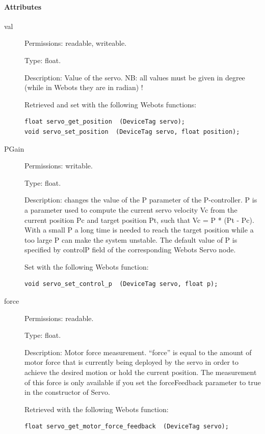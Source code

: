 \paragraph{Attributes}
\label{webots.uobjects.robotdevices.servo.attributes}%

\noindent
\begin{description}
\item[{         val
 }]            Permissions: readable, writeable.


 Type: float.


 Description: Value of the servo. NB: all values must be given in
 degree (while in Webots they are in radian) !


          Retrieved and set with the following Webots functions:


\begin{lstlisting}
float servo_get_position  (DeviceTag servo);
void servo_set_position  (DeviceTag servo, float position);
\end{lstlisting}
\item[{         PGain
 }]            Permissions: writable.


 Type: float.


 Description: changes the value of the P parameter of the
 P-{}controller. P is a parameter used to compute the current servo
 velocity Vc from the current position Pc and target position Pt, such
 that Vc = P * (Pt -{} Pc).  With a small P a long time is needed to
 reach the target position while a too large P can make the system
 unstable.  The default value of P is specified by controlP field of
 the corresponding Webots Servo node.


          Set with the following Webots function:


\begin{lstlisting}
void servo_set_control_p  (DeviceTag servo, float p);
\end{lstlisting}
\item[{         force
 }]            Permissions: readable.


 Type: float.


 Description: Motor force measurement. ``force'' is equal to the amount
 of motor force that is currently being deployed by the servo in order
 to achieve the desired motion or hold the current position.  The
 measurement of this force is only available if you set the
 forceFeedback parameter to true in the constructor of Servo.


          Retrieved with the following Webots function:


\begin{lstlisting}
float servo_get_motor_force_feedback  (DeviceTag servo);
\end{lstlisting}
\end{description}

